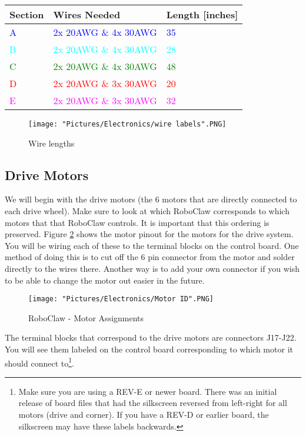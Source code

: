 \documentclass{article}
\begin{document}
\begin{tabular}[3] {| p{2cm} | p{7cm} | p{4cm} |}
	\hline
	\textbf{Section} & \textbf{Wires Needed} & \textbf{Length [inches]}  \\ \hline
	\textcolor{blue}{A} & \textcolor{blue}{2x 20AWG \& 4x 30AWG} & \textcolor{blue}{35} \\ \hline
	\textcolor{cyan}{B} & \textcolor{cyan}{2x 20AWG \& 4x 30AWG} & \textcolor{cyan}{28} \\ \hline
	\textcolor{green}{C} & \textcolor{green}{2x 20AWG \& 4x 30AWG} & \textcolor{green}{48} \\ \hline
	\textcolor{red}{D} & \textcolor{red}{2x 20AWG \& 3x 30AWG} & \textcolor{red}{20} \\ \hline
	\textcolor{magenta}{E} & \textcolor{magenta}{2x 20AWG \& 3x 30AWG} & \textcolor{magenta}{32} \\ \hline
\end{tabular}

\begin{figure}[H]
 	\centering
	\texttt{[image: "Pictures/Electronics/wire labels".PNG]}
 	\caption{Wire lengths}
	\label{wire lengths}
\end{figure}

\subsection{Drive Motors}
We will begin with the drive motors (the 6 motors that are directly connected to each drive wheel). Make sure to look at which RoboClaw corresponds to which motors that that RoboClaw controls. It is important that this ordering is preserved. Figure \ref{motorID} shows the motor pinout for the motors for the drive system. You will be wiring each of these to the terminal blocks on the control board. One method of doing this is to cut off the 6 pin connector from the motor and solder directly to the wires there. Another way is to add your own connector if you wish to be able to change the motor out easier in the future.

\begin{figure}[H]
 	\centering
	\texttt{[image: "Pictures/Electronics/Motor ID".PNG]}
 	\caption{RoboClaw - Motor Assignments}
	\label{motorID}
\end{figure}

The terminal blocks that correspond to the drive motors are connectors J17-J22. You will see them labeled on the control board corresponding to which motor it should connect to\footnote{Make sure you are using a REV-E or newer board.  There was an initial release of board files that had the silkscreen reversed from left-right for all motors (drive and corner). If you have a REV-D or earlier board, the silkscreen may have these labels backwards.}.
\end{document}
